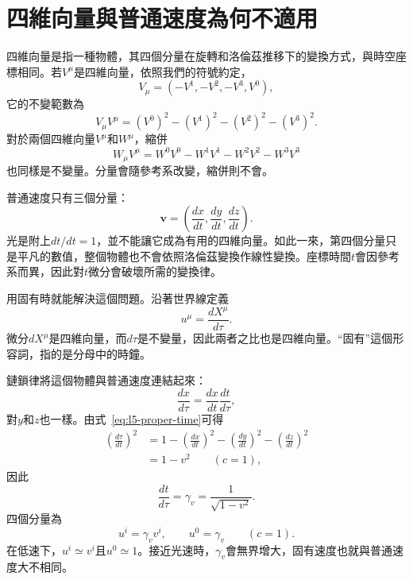 \section{四維向量與普通速度為何不適用}

四維向量是指一種物體，其四個分量在旋轉和洛倫茲推移下的變換方式，與時空座標相同。若\(V^\mu\)是四維向量，依照我們的符號約定，
\begin{equation}
V_\mu=(-V^1,-V^2,-V^3,V^0),
\end{equation}
它的不變範數為
\begin{equation}
V_\mu V^\mu=(V^0)^2-(V^1)^2-(V^2)^2-(V^3)^2.
\end{equation}
對於兩個四維向量\(V^\mu\)和\(W^\mu\)，縮併
\begin{equation}
W_\mu V^\mu
=W^0V^0-W^1V^1-W^2V^2-W^3V^3
\end{equation}
也同樣是不變量。分量會隨參考系改變，縮併則不會。

普通速度只有三個分量：
\begin{equation}
\mathbf v=\left(\frac{dx}{dt},\frac{dy}{dt},\frac{dz}{dt}\right).
\end{equation}
光是附上\(dt/dt=1\)，並不能讓它成為有用的四維向量。如此一來，第四個分量只是平凡的數值，整個物體也不會依照洛倫茲變換作線性變換。座標時間\(t\)會因參考系而異，因此對\(t\)微分會破壞所需的變換律。

用固有時就能解決這個問題。沿著世界線定義
\begin{equation}
u^\mu=\frac{dX^\mu}{d\tau}.
\label{eq:l5-four-velocity}
\end{equation}
微分\(dX^\mu\)是四維向量，而\(d\tau\)是不變量，因此兩者之比也是四維向量。``固有''這個形容詞，指的是分母中的時鐘。

鏈鎖律將這個物體與普通速度連結起來：
\begin{equation}
\frac{dx}{d\tau}=\frac{dx}{dt}\frac{dt}{d\tau},
\end{equation}
對\(y\)和\(z\)也一樣。由式~\eqref{eq:l5-proper-time}可得
\begin{align}
\left(\frac{d\tau}{dt}\right)^2
&=1-\left(\frac{dx}{dt}\right)^2
    -\left(\frac{dy}{dt}\right)^2
    -\left(\frac{dz}{dt}\right)^2\nonumber\\
&=1-v^2
\qquad(c=1),
\end{align}
因此
\begin{equation}
\frac{dt}{d\tau}=\gamma_v=\frac{1}{\sqrt{1-v^2}}.
\end{equation}
四個分量為
\begin{equation}
u^i=\gamma_v v^i,
\qquad
u^0=\gamma_v
\qquad(c=1).
\label{eq:l5-four-velocity-components}
\end{equation}
在低速下，\(u^i\simeq v^i\)且\(u^0\simeq1\)。接近光速時，\(\gamma_v\)會無界增大，固有速度也就與普通速度大不相同。

